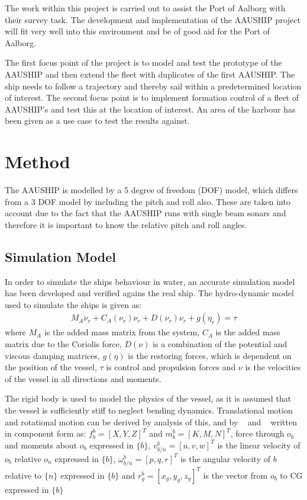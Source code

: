 \documentclass[a4paper,conference]{IEEEtran}
\begin{document}
The work within this project is carried out to assist the Port of
Aalborg with their survey task. The development and implementation of
the AAUSHIP project will fit very well into this environment and be of
good aid for the Port of Aalborg.

The first focus point of the project is to model and test the
prototype of the AAUSHIP and then extend the fleet with duplicates of
the first AAUSHIP. The ship needs to follow a trajectory and thereby
sail within a predetermined location of interest. The second focus
point is to implement formation control of a fleet of AAUSHIP's and
test this at the location of interest. An area of the harbour has been
given as a use case to test the results against.

\section{Method}
The AAUSHIP is modelled by a 5 degree of freedom (DOF) model, which differs
from a 3 DOF model by including the pitch and roll also.
These are taken into account due to the fact that the AAUSHIP runs
with single beam sonars and therefore it is important to know the
relative pitch and roll angles. 

\subsection{Simulation Model}
\label{ch:simulation-model}
In order to simulate the ships behaviour in water, an accurate
simulation model has been developed and verified agains the real ship.
The hydro-dynamic model used to simulate the ships is given as:
\begin{align}
M_A \dot \nu_r + C_A(\nu_r)\nu_r + D(\nu_r)\nu_r + g(\eta_r) = \tau
\label{eq:hydmodel}
\end{align}
where
$M_A$ is the added mass matrix from the system, $C_A$ is the added mass matrix due to the Coriolis force, $D(\nu)$ is a combination of the potential and viscous damping matrices, $g(\eta)$ is the restoring forces, which is dependent on the position of the vessel, $\tau$ is control and propulsion forces and $\nu$ is the velocities of the vessel in all directions and moments.

The rigid body is used to model the physics of the vessel, as it is
assumed that the vessel is sufficiently stiff to neglect bending
dynamics. Translational motion and rotational motion can be derived by
analysis of this, and by ~\citep{sname1950} and ~\citep[sec.
(3.3.1)]{fossen} written in component form as:
$f^b_b = [X,Y,Z]^T$ and $m^b_b = [K,M,N]^T$, force through $o_b$ and moments about $o_b$ expressed in $\{b\}$,
$v^b_{b/n} = [u,v,w]^T$ is the linear velocity of $o_b$ relative $o_n$ expressed in $\{b\}$,
$\omega^b_{b/n} = [p,q,r]^T$ is the angular velocity of ${b}$ relative to $\{n\}$ expressed in  $\{b\}$ and 
$r^b_g = [x_g,y_g,z_g]^T$ is the vector from $o_b$ to CG expressed in $\{b\}$
\end{document}
